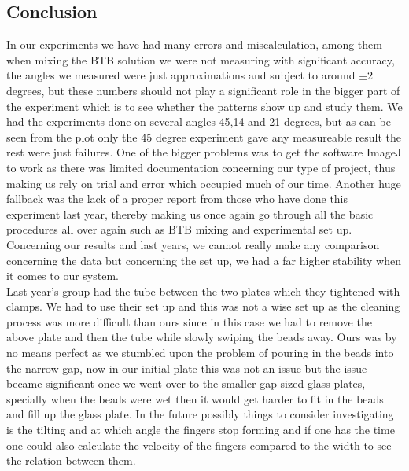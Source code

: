 \documentclass[twoside]{article}
\begin{document}
\begin{multicols}{2}
\subsection{Conclusion} %
\label{sub:conclusion}
In our experiments we have had many errors and miscalculation, among them when mixing the BTB solution we were not measuring with significant accuracy, the angles we measured were just approximations and subject to around $\pm 2$ degrees, but these numbers should not play a significant role in the bigger part of the experiment which is to see whether the patterns show up and study them. We had the experiments done on several angles 45,14 and 21 degrees, but as can be seen from the plot only the 45 degree experiment gave any measureable result the rest were just failures. One of the bigger problems was to get the software ImageJ to work as there was limited documentation concerning our type of project, thus making us rely on trial and error which occupied much of our time. Another huge fallback was the lack of a proper report from those who have done this experiment last year, thereby making us once again go through all the basic procedures all over again such as BTB mixing and experimental set up. Concerning our results and last years, we cannot really make any comparison concerning the data but concerning the set up, we had a far higher stability when it comes to our system. \\
Last year's group had the tube between the two plates which they tightened with clamps. We had to use their set up and this was not a wise set up as the cleaning process was more difficult than ours since in this case we had to remove the above plate and then the tube while slowly swiping the beads away. Ours was by no means perfect as we stumbled upon the problem of pouring in the beads into the narrow gap, now in our initial plate this was not an issue but the issue became significant once we went over to the smaller gap sized glass plates, specially when the beads were wet then it would get harder to fit in the beads and fill up the glass plate. In the future possibly things to consider investigating is the tilting and at which angle the fingers stop forming and if one has the time one could also calculate the velocity of the fingers compared to the width to see the relation between them. 
\end{multicols}
\end{document}
